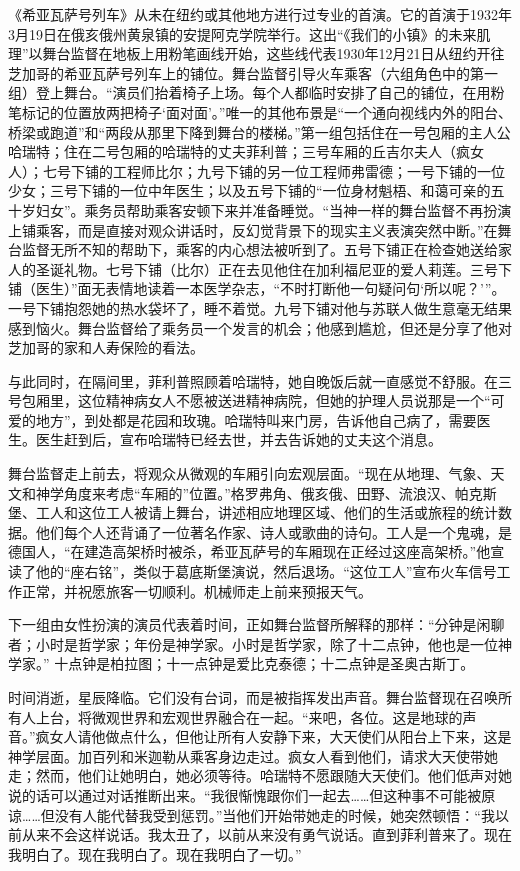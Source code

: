 \documentclass[lang=cn,newtx,12pt,scheme=chinese]{elegantbook}
\begin{document}
《希亚瓦萨号列车》从未在纽约或其他地方进行过专业的首演。它的首演于1932年3月19日在俄亥俄州黄泉镇的安提阿克学院举行。这出“《我们的小镇》的未来肌理”以舞台监督在地板上用粉笔画线开始，这些线代表1930年12月21日从纽约开往芝加哥的希亚瓦萨号列车上的铺位。舞台监督引导火车乘客（六组角色中的第一组）登上舞台。“演员们抬着椅子上场。每个人都临时安排了自己的铺位，在用粉笔标记的位置放两把椅子‘面对面’。”唯一的其他布景是“一个通向视线内外的阳台、桥梁或跑道”和“两段从那里下降到舞台的楼梯。”第一组包括住在一号包厢的主人公哈瑞特；住在二号包厢的哈瑞特的丈夫菲利普；三号车厢的丘吉尔夫人（疯女人）；七号下铺的工程师比尔；九号下铺的另一位工程师弗雷德；一号下铺的一位少女；三号下铺的一位中年医生；以及五号下铺的“一位身材魁梧、和蔼可亲的五十岁妇女”。乘务员帮助乘客安顿下来并准备睡觉。“当神一样的舞台监督不再扮演上铺乘客，而是直接对观众讲话时，反幻觉背景下的现实主义表演突然中断。”在舞台监督无所不知的帮助下，乘客的内心想法被听到了。五号下铺正在检查她送给家人的圣诞礼物。七号下铺（比尔）正在去见他住在加利福尼亚的爱人莉莲。三号下铺（医生）”面无表情地读着一本医学杂志，“不时打断他一句疑问句‘所以呢？’”。一号下铺抱怨她的热水袋坏了，睡不着觉。九号下铺对他与苏联人做生意毫无结果感到恼火。舞台监督给了乘务员一个发言的机会；他感到尴尬，但还是分享了他对芝加哥的家和人寿保险的看法。

与此同时，在隔间里，菲利普照顾着哈瑞特，她自晚饭后就一直感觉不舒服。在三号包厢里，这位精神病女人不愿被送进精神病院，但她的护理人员说那是一个“可爱的地方”，到处都是花园和玫瑰。哈瑞特叫来门房，告诉他自己病了，需要医生。医生赶到后，宣布哈瑞特已经去世，并去告诉她的丈夫这个消息。

舞台监督走上前去，将观众从微观的车厢引向宏观层面。“现在从地理、气象、天文和神学角度来考虑“车厢的”位置。”格罗弗角、俄亥俄、田野、流浪汉、帕克斯堡、工人和这位工人被请上舞台，讲述相应地理区域、他们的生活或旅程的统计数据。他们每个人还背诵了一位著名作家、诗人或歌曲的诗句。工人是一个鬼魂，是德国人，“在建造高架桥时被杀，希亚瓦萨号的车厢现在正经过这座高架桥。”他宣读了他的“座右铭”，类似于葛底斯堡演说，然后退场。“这位工人”宣布火车信号工作正常，并祝愿旅客一切顺利。机械师走上前来预报天气。

下一组由女性扮演的演员代表着时间，正如舞台监督所解释的那样：“分钟是闲聊者；小时是哲学家；年份是神学家。小时是哲学家，除了十二点钟，他也是一位神学家。” 十点钟是柏拉图；十一点钟是爱比克泰德；十二点钟是圣奥古斯丁。

时间消逝，星辰降临。它们没有台词，而是被指挥发出声音。舞台监督现在召唤所有人上台，将微观世界和宏观世界融合在一起。“来吧，各位。这是地球的声音。”疯女人请他做点什么，但他让所有人安静下来，大天使们从阳台上下来，这是神学层面。加百列和米迦勒从乘客身边走过。疯女人看到他们，请求大天使带她走；然而，他们让她明白，她必须等待。哈瑞特不愿跟随大天使们。他们低声对她说的话可以通过对话推断出来。“我很惭愧跟你们一起去……但这种事不可能被原谅……但没有人能代替我受到惩罚。”当他们开始带她走的时候，她突然顿悟：“我以前从来不会这样说话。我太丑了，以前从来没有勇气说话。直到菲利普来了。现在我明白了。现在我明白了。现在我明白了一切。”
\end{document}
